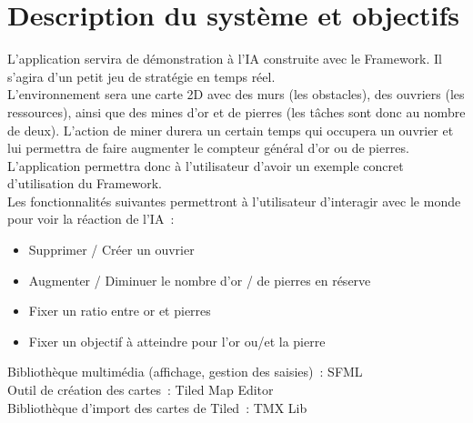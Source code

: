 \section{Description du système et objectifs}

L'application servira de démonstration à l'IA construite avec le Framework. Il s'agira d'un petit jeu de stratégie en temps réel.\\

L'environnement sera une carte 2D avec des murs (les obstacles), des ouvriers (les ressources), ainsi que des mines d'or et de pierres (les tâches sont donc au nombre de deux). L'action de miner durera un certain temps qui occupera un ouvrier et lui permettra de faire augmenter le compteur général d'or ou de pierres.\\

L'application permettra donc à l'utilisateur d'avoir un exemple concret d'utilisation du Framework.\\

Les fonctionnalités suivantes permettront à l'utilisateur d'interagir avec le monde pour voir la réaction de l'IA~:
\begin{itemize}
\item Supprimer / Créer un ouvrier
\item Augmenter / Diminuer le nombre d'or / de pierres en réserve
\item Fixer un ratio entre or et pierres
\item Fixer un objectif à atteindre pour l'or ou/et la pierre
\end{itemize} \vspace{8mm}

\noindent Bibliothèque multimédia (affichage, gestion des saisies)~: SFML\\
Outil de création des cartes~: Tiled Map Editor\\
Bibliothèque d'import des cartes de Tiled~: TMX Lib
